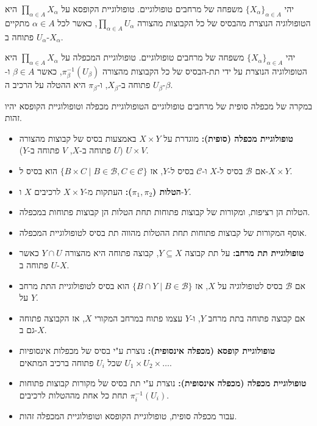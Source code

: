\documentclass{tstextbook}
\begin{document}
\begin{definition}
יהי \(\{X_\alpha\}_{\alpha\in A}\) משפחה של מרחבים טופולוגיים. טופולוגיית הקופסא על \(\prod_{\alpha\in A} X_\alpha\) היא הטופולוגיה הנוצרת מהבסיס של כל הקבוצות מהצורה \(\prod_{\alpha\in A} U_\alpha\), כאשר לכל \(\alpha\in A\) מתקיים \(U_\alpha\) פתוחה ב-\(X_\alpha\).

\end{definition}
\begin{definition}
יהי \(\{X_\alpha\}_{\alpha\in A}\) משפחה של מרחבים טופולוגיים. טופולוגיית המכפלה על \(\prod_{\alpha\in A} X_\alpha\) היא הטופולוגיה הנוצרת על ידי תת-הבסיס של כל הקבוצות מהצורה \(\pi_\beta^{-1}(U_\beta)\), כאשר \(\beta\in A\) ו-\(U_\beta\) פתוחה ב-\(X_\beta\), ו-\(\pi_\beta\) היא ההטלה על הרכיב ה-\(\beta\).

\end{definition}
\begin{remark}
במקרה של מכפלה סופית של מרחבים טופולוגיים הטופולוגיית מכפלה וטופולוגיית הקופסא יהיו זהות.

\end{remark}
\begin{summary}
  \begin{itemize}
    \item \textbf{טופולוגיית מכפלה (סופית):} מוגדרת על \(X \times Y\) באמצעות בסיס של קבוצות מהצורה \(U \times V\) (\(U\) פתוחה ב-\(X\), \(V\) פתוחה ב-\(Y\)).
    \item אם \(\mathcal{B}\) בסיס ל-\(X\) ו-\(\mathcal{C}\) בסיס ל-\(Y\), אז \(\{B \times C \mid B \in \mathcal{B}, C \in \mathcal{C}\}\) הוא בסיס ל-\(X \times Y\).
    \item \textbf{הטלות (\(\pi_1, \pi_2\)):} העתקות מ-\(X \times Y\) לרכיבים \(X\) ו-\(Y\).
    \item הטלות הן רציפות, ומקורות של קבוצות פתוחות תחת הטלות הן קבוצות פתוחות במכפלה.
    \item אוסף המקורות של קבוצות פתוחות תחת ההטלות מהווה תת בסיס לטופולוגיית המכפלה.
    \item \textbf{טופולוגיית תת מרחב:} על תת קבוצה \(Y \subseteq X\), קבוצה פתוחה היא מהצורה \(Y \cap U\) כאשר \(U\) פתוחה ב-\(X\).
    \item אם \(\mathcal{B}\) בסיס לטופולוגיה על \(X\), אז \(\{B \cap Y \mid B \in \mathcal{B}\}\) הוא בסיס לטופולוגיית התת מרחב על \(Y\).
    \item אם קבוצה פתוחה בתת מרחב \(Y\), ו-\(Y\) עצמו פתוח במרחב המקורי \(X\), אז הקבוצה פתוחה גם ב-\(X\).
    \item \textbf{טופולוגיית קופסא (מכפלה אינסופית):} נוצרת ע"י בסיס של מכפלות אינסופיות \(U_1 \times U_2 \times \dots\) שכל \(U_i\) פתוחה ברכיב המתאים.
    \item \textbf{טופולוגיית מכפלה (מכפלה אינסופית):} נוצרת ע"י תת בסיס של מקורות קבוצות פתוחות תחת כל אחת מההטלות לרכיבים \(\pi_i^{-1}(U_i)\).
    \item עבור מכפלה סופית, טופולוגיית הקופסא וטופולוגיית המכפלה זהות.
  \end{itemize}
\end{summary}
\end{document}
